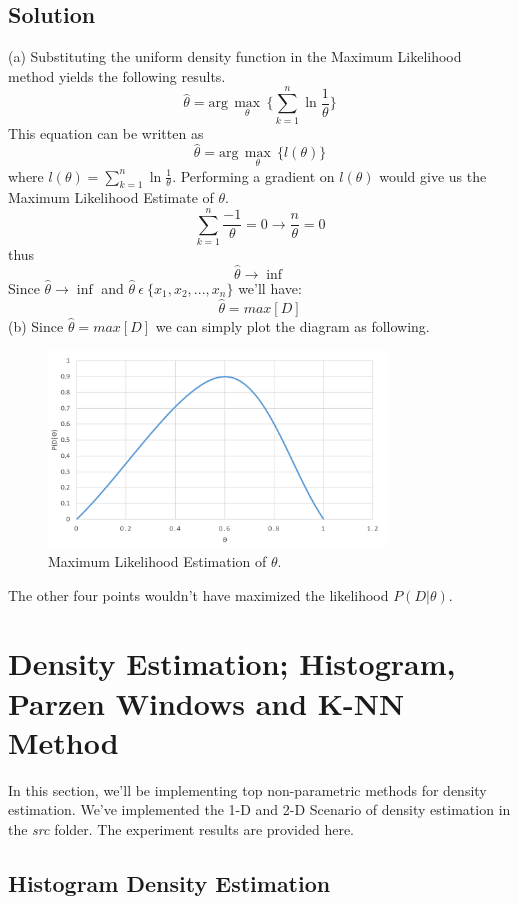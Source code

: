 \documentclass[12pt]{article}
\numberwithin{equation}{section}
\numberwithin{table}{section}
\numberwithin{figure}{section}
\begin{document}
\subsection*{Solution}
(a) Substituting the uniform density function in the Maximum Likelihood method yields the following results.
\begin{equation}
\hat{\theta} = \text{arg}\,\max\limits_{\theta}\, \{\sum_{k = 1}^{n} \ln \frac{1}{\theta}\}
\end{equation}
This equation can be written as
$$
	\hat{\theta} = \text{arg}\,\max\limits_{\theta}\, \{l(\theta)\}
$$
where $l(\theta) = \sum_{k = 1}^{n} \ln \frac{1}{\theta}$. Performing a gradient on $l(\theta)$ would give us the Maximum Likelihood Estimate of $\theta$.
$$
	\sum_{k = 1}^{n} \frac{-1}{\theta} = 0 \rightarrow \frac{n}{\theta} = 0
$$
thus 
$$
	\hat{\theta} \rightarrow \inf
$$
Since $\hat{\theta} \rightarrow \inf$ and $\hat{\theta}\  \epsilon\  \{x_1, x_2, ..., x_n\}$ we'll have:
$$
	\hat{\theta} = max[D]
$$
(b) Since $	\hat{\theta} = max[D] $ we can simply plot the diagram as following.
\begin{figure}[!h]\centering
	\includegraphics[width=0.8\textwidth]{2_b.PNG}
	\caption{Maximum Likelihood Estimation of $\theta$.}
	\label{pl1}
\end{figure}

The other four points wouldn't have maximized the likelihood $P(D|\theta)$.
\section{Density Estimation; Histogram, Parzen Windows and K-NN Method}
In this section, we'll be implementing top non-parametric methods for density estimation. We've implemented the 1-D and 2-D Scenario of density estimation in the \textit{src} folder. The experiment results are provided here.
\subsection*{Histogram Density Estimation}
\end{document}
